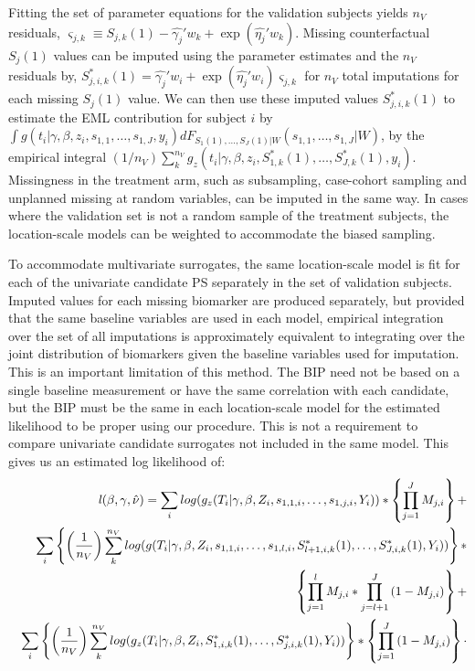 \documentclass[times, doublespace]{simauth}
\begin{document}
Fitting the set of parameter equations for the validation subjects yields $n_V$ residuals, $\varsigma_{j,k} \equiv S_{j,k}(1) - \hat{\gamma_j}'w_{k} + \exp(\hat{\eta_j}'w_{k})$. Missing counterfactual $S_{j}(1)$ values can be imputed using the parameter estimates and the $n_V$ residuals by, $S_{j,i,k}^*(1) = \hat{\gamma_j}'w_{i} + \exp(\hat{\eta_j}'w_{i}) \varsigma_{j,k}$ for $n_V$ total imputations for each missing $S_{j}(1)$ value. We can then use these imputed values $S_{j,i,k}^*(1)$ to estimate the EML contribution for subject $i$ by $\int g(t_i|\gamma, \beta, z_i, s_{1,1}, \ldots, s_{1,J}, y_i)dF_{S_{1}(1),\ldots,S_{J}(1)|W}(s_{1,1},\ldots,s_{1,J}|W)$, by the empirical integral ${\left(1/n_{V}\right)}\sum_k^{n_V}{g_z(t_i|\gamma, \beta,z_i, S_{1,k}^*(1), \ldots,S_{J,k}^*(1),y_i)}$. Missingness in the treatment arm, such as subsampling, case-cohort sampling and unplanned missing at random variables, can be imputed in the same way. In cases where the validation set is not a random sample of the treatment subjects, the location-scale models can be weighted to accommodate the biased sampling.  

To accommodate multivariate surrogates, the same location-scale model is fit for each of the univariate candidate PS separately in the set of validation subjects. Imputed values for each missing biomarker are produced separately, but provided that the same baseline variables are used in each model, empirical integration over the set of all imputations is approximately equivalent to integrating over the joint distribution of biomarkers given the baseline variables used for imputation. This is an important limitation of this method. The BIP need not be based on a single baseline measurement or have the same correlation with each candidate, but the BIP must be the same in each location-scale model for the estimated likelihood to be proper using our procedure. This is not a requirement to compare univariate candidate surrogates not included in the same model. This gives us an estimated log likelihood of:
\begin{eqnarray*}
&&\mathit{l}(\beta,\gamma, \hat{\nu})=\sum_{i} log(g_z(T_i|\gamma, \beta,Z_i, s_{1,1,i}, \ldots,s_{1,j,i},Y_i))*\left\{\prod_{j=1}^{J}{M
_{j,i}}\right\}+\\
&&\sum_{i}\left\{\left({1 \over n_{V}}\right)\sum_k^{n_V}{log(g(T_i|\gamma, \beta, Z_i,s_{1,1,i},\ldots, s_{1,l,i}, S^{*}_{l+1,i,k}(1),\ldots, S^{*}_{J,i,k}(1), Y_i))}\right\}*\\
&&\left\{\prod_{j=1}^{l}{M_{j,i}}*\prod_{j=l+1}^{J}{(1-M_{j,i})}\right\}+\\
&&\sum_{i}\left\{\left({1 \over n_{V}}\right)\sum_k^{n_V}{log(g_z(T_i|\gamma, \beta,Z_i, S_{1,i,k}^*(1), \ldots,S_{j,i,k}^*(1),Y_i))}\right\}*\left\{\prod_{j=1}^{J}{(1-M
_{j,i})}\right\}\cdot
\end{eqnarray*}
\end{document}
